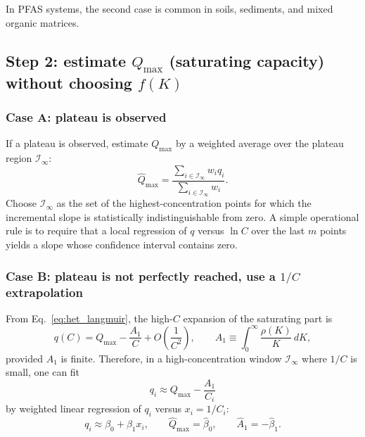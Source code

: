 \documentclass[12pt]{article}
\begin{document}
	In PFAS systems, the second case is common in soils, sediments, and mixed organic matrices.
	
	\subsection{Step 2: estimate $Q_{\max}$ (saturating capacity) without choosing $f(K)$}
	
	\subsubsection{Case A: plateau is observed}
	
	If a plateau is observed, estimate $Q_{\max}$ by a weighted average over the plateau region $\mathcal{I}_\infty$:
	\begin{equation}
		\widehat{Q}_{\max} =
		\frac{\sum_{i\in\mathcal{I}_\infty} w_i q_i}{\sum_{i\in\mathcal{I}_\infty} w_i}.
		\label{eq:Qmax_plateau}
	\end{equation}
	Choose $\mathcal{I}_\infty$ as the set of the highest-concentration points for which the incremental slope is statistically indistinguishable from zero. A simple operational rule is to require that a local regression of $q$ versus $\ln C$ over the last $m$ points yields a slope whose confidence interval contains zero.
	
	\subsubsection{Case B: plateau is not perfectly reached, use a $1/C$ extrapolation}
	
	From Eq.~\eqref{eq:het_langmuir}, the high-$C$ expansion of the saturating part is
	\begin{equation}
		q(C) = Q_{\max} - \frac{A_1}{C} + O\!\left(\frac{1}{C^2}\right),
		\qquad
		A_1 \equiv \int_0^\infty \frac{\rho(K)}{K}\,dK,
		\label{eq:highC_expansion}
	\end{equation}
	provided $A_1$ is finite. Therefore, in a high-concentration window $\mathcal{I}_\infty$ where $1/C$ is small, one can fit
	\begin{equation}
		q_i \approx Q_{\max} - \frac{A_1}{C_i}
		\label{eq:Qmax_linfit}
	\end{equation}
	by weighted linear regression of $q_i$ versus $x_i = 1/C_i$:
	\begin{equation}
		q_i \approx \beta_0 + \beta_1 x_i,
		\qquad
		\widehat{Q}_{\max} = \widehat{\beta}_0,
		\qquad
		\widehat{A}_1 = -\widehat{\beta}_1.
	\end{equation}
	
\end{document}
